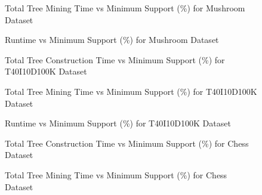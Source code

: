             \begin{figure}[h]
            \centering
                
            \caption{Total Tree Mining Time vs Minimum Support (\%) for Mushroom Dataset }
            \label{result:g_m_mining_total}
            \end{figure}
            \begin{figure}[h]
            \centering
                
            \caption{Runtime vs Minimum Support (\%) for Mushroom Dataset }
            \label{result:g_m_total}
            \end{figure}
            \begin{figure}[h]
            \centering
                
            \caption{Total Tree Construction Time vs Minimum Support (\%) for T40I10D100K Dataset }
            \label{result:g_t10_tree_construction_total}
            \end{figure}
            
            \begin{figure}[h]
            \centering
                
            \caption{Total Tree Mining Time vs Minimum Support (\%) for T40I10D100K Dataset }
            \label{result:g_t10_mining_total}
            \end{figure}
            
            \begin{figure}[h]
            \centering
                
            \caption{Runtime vs Minimum Support (\%) for T40I10D100K Dataset }
            \label{result:g_t10_total}
            \end{figure}
    
            \begin{figure}[h]
            \centering
                
            \caption{Total Tree Construction Time vs Minimum Support (\%) for Chess Dataset }
            \label{result:g_chess_tree_construction_total}
            \end{figure}
            
            \begin{figure}[h]
            \centering
                
            \caption{Total Tree Mining Time vs Minimum Support (\%) for Chess Dataset }
            \label{result:g_chess_mining_total}
            \end{figure}
            
